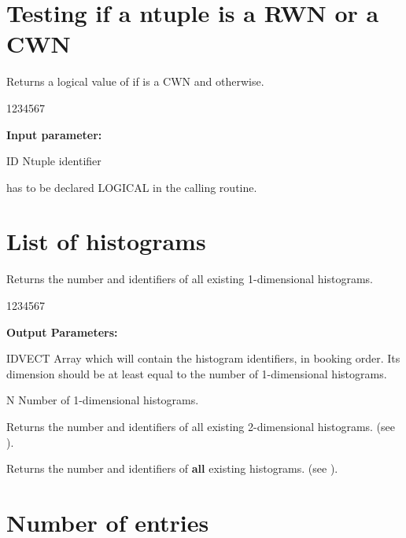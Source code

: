 \section{Testing if a ntuple is a RWN or a CWN}
\label{NTNEW}
 
 
\Action
Returns a logical value of  if 
is a CWN and  otherwise.
 
\begin{DLtt}{1234567}
\item[{\rm\bf Input parameter:}]
\item[ID] Ntuple identifier
\end{DLtt}
 
\Remark
{} has to be declared LOGICAL in the calling routine.

 
\section{List of histograms}
\label{HISTLIST}
 
 
\Action
Returns the number and identifiers of all existing 1-dimensional histograms.
 
\begin{DLtt}{1234567}
\item[{\rm\bf Output Parameters:}]
\item[IDVECT] Array which will contain the histogram identifiers, in
     booking order. Its dimension should be at least equal to the number of
     1-dimensional histograms.
\item[N] Number of 1-dimensional histograms.
\end{DLtt}
 
 
\Action
Returns the number and identifiers of all existing 2-dimensional histograms.
(see ).
 
 
\Action
Returns the number and identifiers of {\bf all} existing histograms.
(see ).
 
\section{Number of entries}
\label{HNUMENTR}
 
